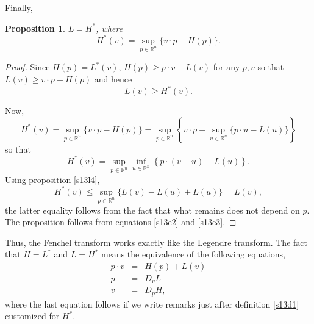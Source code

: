 \documentclass{article}
\theoremstyle{plain}
\numberwithin{thm}{section}
\theoremstyle{plain}
\newtheorem{prop}{Proposition}
\numberwithin{prop}{section}
\theoremstyle{definition}
\numberwithin{defn}{section}
\theoremstyle{remark}
\numberwithin{equation}{section}
\begin{document}
Finally,
\begin{prop}\label{s13l5}
$L = H^\ast$, where
\[
H^\ast(v) = \sup_{p \in \mathbb{R}^n}\{v \cdot p - H(p)\}.
\]
\end{prop}
\begin{proof}
Since $H(p) = L^\ast(v)$, $H(p) \ge p\cdot v - L(v)$ for any $p, v$ so that $L(v) \ge v \cdot p - 
H(p)$ and hence 
\begin{equation}\label{s13e2}
L(v) \ge H^\ast(v).
\end{equation}

Now,
\[
H^\ast(v) = \sup_{p \in \mathbb{R}^n}\{v \cdot p - H(p)\}
= \sup_{p \in \mathbb{R}^n}\left\{v\cdot p - \sup_{u\in\mathbb{R}^n}\{p\cdot u - L(u)\}\right\}
\]
so that
\[
H^\ast(v) = \sup_{p \in \mathbb{R}^n}\inf_{u \in \mathbb{R}^n}\left\{p\cdot(v-u) + L(u)\right\}.
\]
Using proposition \ref{s13l4},
\begin{equation}\label{s13e3}
H^\ast(v) \le \sup_{p \in \mathbb{R}^n}\{ L(v) - L(u) + L(u)\} = L(v),
\end{equation}
the latter equality follows from the fact that what remains does not depend on $p$. The proposition 
follows from equations \eqref{s13e2} and \eqref{s13e3}.
\end{proof}

Thus, the Fenchel transform works exactly like the Legendre transform. The fact that $H = L^\ast$ 
and $L = H^\ast$ means the equivalence of the following equations,
\begin{eqnarray}
p \cdot v &=& H(p) + L(v) \label{s13e4} \\
p &=& D_v L \label{s13e5} \\
v &=& D_p H \label{s13e6},
\end{eqnarray}
where the last equation follows if we write remarks just after definition \ref{s13d1} customized 
for $H^\ast$.
\end{document}
